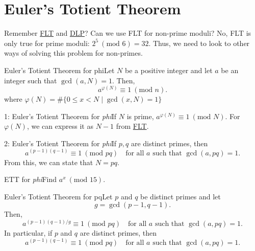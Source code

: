 \section{Euler's Totient Theorem}

\renewcommand{\theenumi}{\arabic{enumi}}
\renewcommand{\labelenumi}{\theenumi.}

Remember \hyperref[thm:Fermat's Little Theorem]{FLT} and \hyperref[Discrete Logarithm Problem]{DLP}? Can we use FLT for non-prime moduli? No, FLT is only true for prime moduli: \(2^5 \ (\text{mod 6}) = 32 \). Thus, we need to look to other ways of solving this problem for non-primes.

\begin{theorem}
    {Euler's Totient Theorem for phi}Let \(N\) be a positive integer and let \(a\) be an integer such that \(\gcd(a, N) = 1\). Then, \[
        a^{\varphi(N)} \equiv 1 \ (\text{mod }{n}).
    \] where \(\varphi(N) = \#\{0 \leq x < N \mid \gcd(x,N) = 1\}\)
\end{theorem}

\begin{corollary}
    {1: Euler's Totient Theorem for \textit{phi}}If \(N\) is prime, \(a^{\varphi(N)} \equiv 1 \ (\text{mod } N)\). For \(\varphi(N)\), we can express it as \(N-1\) from \hyperref[thm:Fermat's Little Theorem]{FLT}.
\end{corollary}


\begin{corollary}
    {2: Euler's Totient Theorem for \textit{phi}}If \(p,q\) are distinct primes, then \[
        a^{(p-1)(q-1)} \equiv 1 \ (\text{mod } pq) \quad \text{for all } a  \text{ such that } \gcd(a, pq) = 1.
    \] From this, we can state that \(N = pq\).
\end{corollary}


\begin{example}
    {ETT for \textit{phi}}Find \(a^x \ (\text{mod } 15)\).
\end{example}



\begin{theorem}
    {Euler's Totient Theorem for pq}Let \(p\) and \(q\) be distinct primes and let \[
        g = \gcd(p-1, q-1).
    \]Then, \[
        a^{(p-1)(q-1)/g} \equiv 1 \ (\text{mod } pq) \quad \text{for all } a  \text{ such that } \gcd(a, pq) = 1.
    \] In particular, if \(p\) and \(q\) are distinct primes, then \[
        a^{(p-1)(q-1)} \equiv 1 \ (\text{mod } pq) \quad \text{for all } a  \text{ such that } \gcd(a, pq) = 1.
    \]
\end{theorem}

